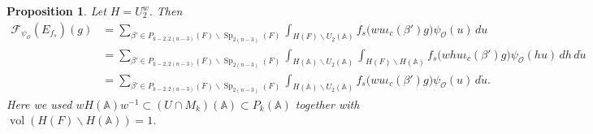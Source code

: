 \documentclass[11pt,notitlepage]{amsart}
\newtheorem{proposition}[theorem]{Proposition}
\theoremstyle{definition}
\theoremstyle{remark}
\newcommand{\calO}{\mathcal{O}}
\DeclareMathOperator{\Sp}{Sp}
\begin{document}
\begin{proposition}
    Let $H=U_2^w$. Then
\[
\begin{aligned}
\mathcal F_{\psi_{\calO}}(E_{f_s})(g)
&=
\sum_{\beta'
 \in P_{k-2,2(n-3)}(F)\backslash\Sp_{2(n-3)}(F)}
\int_{H(F)\backslash U_2(\mathbb A)}
f_s\bigl(wu\iota_c(\beta')g\bigr)\psi_{\calO}(u)\,du\\
&=
\sum_{\beta'
 \in P_{k-2,2(n-3)}(F)\backslash\Sp_{2(n-3)}(F)}
\int_{H(\mathbb A)\backslash U_2(\mathbb A)}
\int_{H(F)\backslash H(\mathbb A)}
f_s\bigl(whu\iota_c(\beta')g\bigr)
\psi_{\calO}(hu)\,dh\,d\dot u\\
&=
\sum_{\beta'
 \in P_{k-2,2(n-3)}(F)\backslash\Sp_{2(n-3)}(F)}
\int_{H(\mathbb A)\backslash U_2(\mathbb A)}
f_s\bigl(wu\iota_c(\beta')g\bigr)
\psi_{\calO}(u)\,d\dot u.
\end{aligned}
\]
Here we used
$wH(\mathbb A)w^{-1}
\subset
(U\cap M_k)(\mathbb A)
\subset
P_k(\mathbb A)$ together with $\operatorname{vol}(H(F)\backslash H(\mathbb A))=1$.
\end{proposition}
\end{document}
